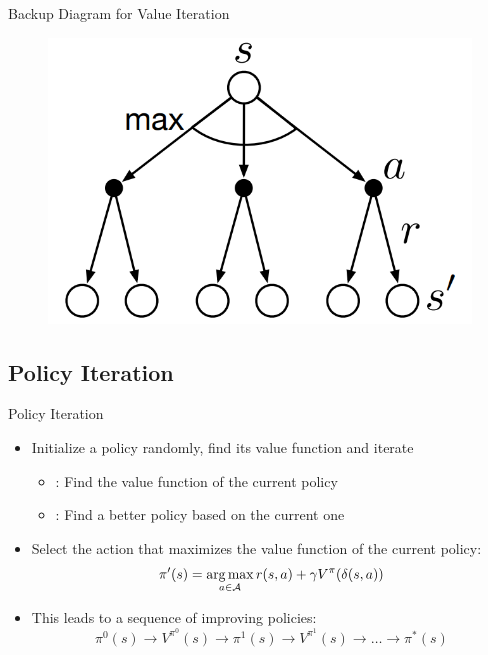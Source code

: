 \begin{frame}{Backup Diagram for Value Iteration}{}
	\begin{figure}
		\centering
		\includegraphics[scale=0.45]{14_rl/02_img/backup_diagram_value_iteration}
	\end{figure}
\end{frame}


\subsection{Policy Iteration}

\begin{frame}{Policy Iteration}{}
	\begin{itemize}
		\item Initialize a policy randomly, find its value function and iterate
		\begin{itemize}
			\item {}: Find the value function of the current policy
			\item {}: Find a better policy based on the current one
		\end{itemize}
		\item Select the action that maximizes the value function of the current policy:
		\begin{equation}
			\pi'(s) = \operatorname*{arg\,max}_{a \in \mathcal{A}} r(s, a) + \gamma V^{\pi}(\delta(s, a))
		\end{equation}
		\item This leads to a sequence of improving policies:
		\begin{equation*}
			\pi^0(s) \longrightarrow V^{\pi^0}(s) \longrightarrow \pi^1(s) \longrightarrow V^{\pi^1}(s)
			\longrightarrow \dots \longrightarrow \pi^*(s)
		\end{equation*}
	\end{itemize}
\end{frame}


